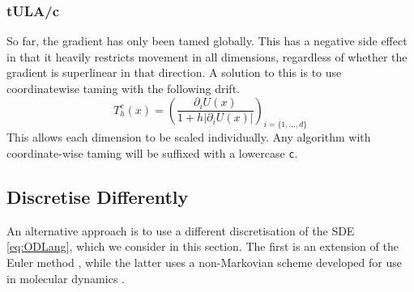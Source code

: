 \subsubsection{tULA/c}
So far, the gradient has only been tamed globally. This has a negative side effect in that it heavily restricts movement in all dimensions, regardless of whether the gradient is superlinear in that direction. A solution to this is to use coordinatewise taming with the following drift.
  \[T^c_{h}(x) =\left(\frac{\partial_i U(x)}{1+h|\partial_i U(x)|}\right)_{i=\lbrace 1, \dots, d\rbrace} \]
This allows each dimension to be scaled individually. Any algorithm with coordinate-wise taming will be suffixed with a lowercase \texttt{c}.

\subsection{Discretise Differently}
An alternative approach is to use a different discretisation of the SDE \eqref{eq:ODLang}, which we consider in this section. The first is an extension of the Euler method \cite{Sabanis18tHOLA}, while the latter uses a non-Markovian scheme developed for use in molecular dynamics \cite{LM12}.
